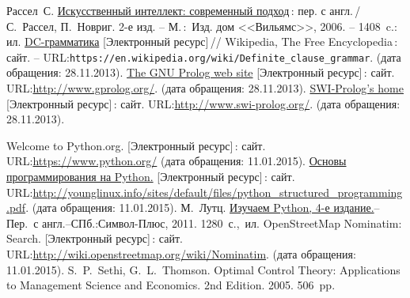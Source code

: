 \documentclass[a4paper,14pt, openany, twoside, draft]{extbook} %
\def\emphbib#1{#1}
\begin{document}
\begin{thebibliography}{99}
 Рассел~С. \href{http://www.aiportal.ru/downloads/books/ai-modern-approach-2-edition-by-rassel-norvig.html}{Искусственный интеллект: современный подход}\,{}: пер. с англ.\,{}/ С.~Рассел, П.~Новриг. 2-е изд. -- М.\,:~Изд. дом <<Вильямс>>, 2006. -- 1408~c.: ил.
 \emphbib{\href{https://en.wikipedia.org/wiki/Definite_clause_grammar}{DC-грамматика}} [Электронный ресурс]\,{}// Wikipedia, The Free Encyclopedia\,{}: сайт. -- URL:\texttt{https://en.wikipedia.org/wiki/Definite\_clause\linebreak\_grammar}. (дата обращения: 28.11.2013).
 \emphbib{\href{http://www.gprolog.org/}{The GNU Prolog web site} [Электронный ресурс]\,{}: сайт}. URL:\url{http://www.gprolog.org/}. (дата обращения: 28.11.2013).
 \emphbib{\href{http://www.swi-prolog.org/}{SWI-Prolog's home} [Электронный ресурс]\,{}: сайт}. URL:\url{http://www.swi-prolog.org/}. (дата обращения: 28.11.2013).

 Welcome to Python.org.  [Электронный ресурс]\,{}: сайт. URL:\url{https://www.python.org/} (дата обращения: 11.01.2015).
 \href{http://younglinux.info/sites/default/files/python_structured_programming.pdf}{Основы программирования на Python.}  [Электронный ресурс]\,{}: сайт. URL:\url{http://younglinux.info/sites/default/files/python_structured_programming.pdf}. (дата обращения: 11.01.2015).
М.~Лутц.  \href{https://vk.com/doc10903696_196246835?hash=4b80f3cf914c7d65dd&dl=f90686bee18e565271}{Изучаем Python, 4-е издание.}-- Пер.~с англ.--СПб.:Символ-Плюс, 2011. 1280~с.,~ил.
 OpenStreetMap Nominatim: Search.  [Электронный ресурс]\,{}: сайт. URL:\url{http://wiki.openstreetmap.org/wiki/Nominatim}. (дата обращения: 11.01.2015).
S.~P.~Sethi, G.~L.~Thomson. Optimal Control Theory: Applications to Management Science and Economics. 2nd Edition. 2005. 506~pp.
\end{thebibliography}
\label{lastpage}
\newpage
\thispagestyle{empty}
\mbox{}

\vfill\vfill\vfill\vfill
\end{document}
